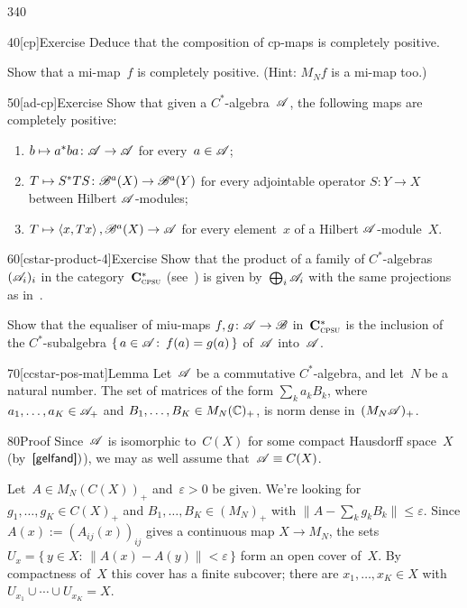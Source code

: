 \begin{parsec}{340}
\begin{point}{40}[cp]{Exercise}
Deduce that the composition of cp-maps is
completely positive.

Show that a mi-map~$f$ is completely positive.
(Hint: $M_Nf$ is a mi-map too.)
\end{point}
\begin{point}{50}[ad-cp]{Exercise}%
Show that
given a $C^*$-algebra~$\mathscr{A}$,
the following maps are completely positive:
\begin{enumerate}
\item
$b\mapsto a^*ba\colon \mathscr{A}\to\mathscr{A}$
for every~$a\in\mathscr{A}$;%
\item
$T\mapsto S^* T S\colon \mathscr{B}^a(X)
\to\mathscr{B}^a(Y)$
for every adjointable operator $S\colon Y\to X$
between Hilbert $\mathscr{A}$-modules;
\item
$T\mapsto \left<x,Tx\right>,\mathscr{B}^a(X)\to \mathscr{A}$%
for every element~$x$ of a Hilbert $\mathscr{A}$-module~$X$.
\end{enumerate}
\spacingfix%
\end{point}%
\begin{point}{60}[cstar-product-4]{Exercise}%
%
%
Show that the product 
of a family of $C^*$-algebras $(\mathscr{A}_i)_i$
in the category~$\mathbf{C}^*_{\text{\textsc{cpsu}}}$
(see~) 
is given by~$\bigoplus_i \mathscr{A}_i$
with the same projections as in~.

Show that the equaliser
of miu-maps $f,g\colon\mathscr{A}\to\mathscr{B}$
in~$\mathbf{C}^*_{\text{\textsc{cpsu}}}$
is the inclusion of
the $C^*$-subalgebra
$\{\,a\in\mathscr{A}\colon\, f(a)=g(a)\,\}$
of~$\mathscr{A}$ into~$\mathscr{A}$.
\end{point}
\begin{point}{70}[ccstar-pos-mat]{Lemma}%
Let~$\mathscr{A}$ be a commutative $C^*$-algebra,
and let~$N$ be a natural number.
The set of  matrices of the form $\sum_k a_k B_k$,
where $a_1,\dotsc,a_K\in \mathscr{A}_+$
and $B_1,\dotsc,B_K\in M_N(\mathbb{C})_+$,
is norm dense in~$(M_N\mathscr{A})_+$.
\begin{point}{80}{Proof}%
Since~$\mathscr{A}$ is isomorphic to~$C(X)$ for some compact
Hausdorff space~$X$ (by~$\sref{gelfand})$),
we may as well assume that~$\mathscr{A}\equiv C(X)$.

Let~$A\in M_N(C(X))_+$ and~$\varepsilon>0$ be given.
We're looking for $g_1,\dotsc,g_K\in C(X)_+$
and $B_1,\dotsc,B_K\in (M_N)_+$
with $\|A-\sum_k g_k B_k\|\leq \varepsilon$.
Since $A(x):=(A_{ij}(x))_{ij}$
gives a continuous map $X\to M_N$,
the sets
$U_x = \{\,y\in X\colon \, \|A(x)-  A(y)\| < \varepsilon\,\}$
form an open cover of~$X$.
By compactness of~$X$
this cover has a finite subcover;
there are $x_1,\dotsc,x_K\in X$ with
$U_{x_1}\cup\dotsb\cup U_{x_K}=X$.


\end{point}
\end{point}
\end{parsec}
